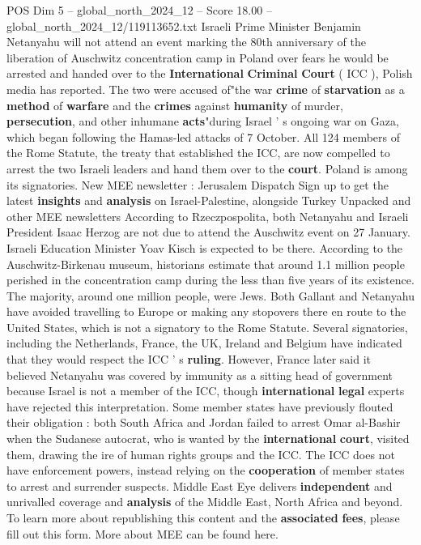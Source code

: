 \begin{textsample}{POS Dim 5 – global\_north\_2024\_12 – Score 18.00 – global\_north\_2024\_12/119113652.txt}  \label{ex:f5_pos_099}
Israeli Prime Minister Benjamin Netanyahu will not attend an event marking the 80th anniversary of the liberation of Auschwitz concentration camp in Poland over fears he would be arrested and handed over to the \textbf{International} \textbf{Criminal} \textbf{Court} ( ICC ), Polish media has reported.
The two were accused of"the war \textbf{crime} of \textbf{starvation} as a \textbf{method} of \textbf{warfare} and the \textbf{crimes} against \textbf{humanity} of murder, \textbf{persecution}, and other inhumane \textbf{acts}"during Israel ' s ongoing war on Gaza, which began following the Hamas-led attacks of 7 October.
All 124 members of the Rome Statute, the treaty that established the ICC, are now compelled to arrest the two Israeli leaders and hand them over to the \textbf{court}.
Poland is among its signatories.
New MEE newsletter : Jerusalem Dispatch Sign up to get the latest \textbf{insights} and \textbf{analysis} on Israel-Palestine, alongside Turkey Unpacked and other MEE newsletters According to Rzeczpospolita, both Netanyahu and Israeli President Isaac Herzog are not due to attend the Auschwitz event on 27 January.
Israeli Education Minister Yoav Kisch is expected to be there.
According to the Auschwitz-Birkenau museum, historians estimate that around 1.1 million people perished in the concentration camp during the less than five years of its existence.
The majority, around one million people, were Jews.
Both Gallant and Netanyahu have avoided travelling to Europe or making any stopovers there en route to the United States, which is not a signatory to the Rome Statute.
Several signatories, including the Netherlands, France, the UK, Ireland and Belgium have indicated that they would respect the ICC ' s \textbf{ruling}.
However, France later said it believed Netanyahu was covered by immunity as a sitting head of government because Israel is not a member of the ICC, though \textbf{international} \textbf{legal} experts have rejected this interpretation.
Some member states have previously flouted their obligation : both South Africa and Jordan failed to arrest Omar al-Bashir when the Sudanese autocrat, who is wanted by the \textbf{international} \textbf{court}, visited them, drawing the ire of human rights groups and the ICC.
The ICC does not have enforcement powers, instead relying on the \textbf{cooperation} of member states to arrest and surrender suspects.
Middle East Eye delivers \textbf{independent} and unrivalled coverage and \textbf{analysis} of the Middle East, North Africa and beyond.
To learn more about republishing this content and the \textbf{associated} \textbf{fees}, please fill out this form.
More about MEE can be found here.

\end{textsample}
